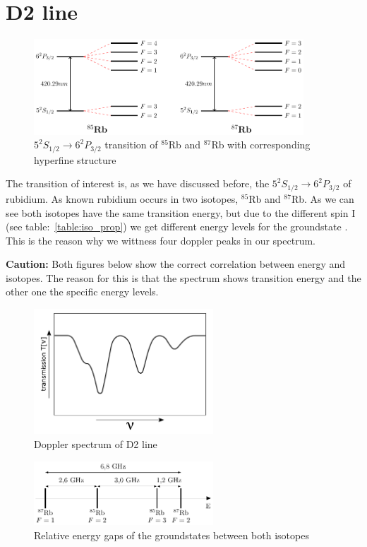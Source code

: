 \section{D2 line} %

\begin{figure}[h]
\centering
\includegraphics[width=0.9\textwidth]{energylevel}
\caption{\(5^{2}S_{1/2} \rightarrow 6^{2}P_{3/2}\) transition of \(^{85}\)Rb and \(^{87}\)Rb with corresponding hyperfine structure}    
\end{figure}

\vspace{\fill}

The transition of interest is, as we have discussed before, the \(5^{2}S_{1/2} \rightarrow 6^{2}P_{3/2}\) of rubidium. As known rubidium
occurs in two isotopes, \(^{85}\)Rb and \(^{87}\)Rb.
As we can see both isotopes have the same transition energy, but due to the different spin I (see table:~\ref{table:iso_prop}) we get
different energy levels for the groundstate \citep{nist_asd}. This is the reason why we wittness four doppler peaks in our spectrum.
\bigskip

\textbf{Caution:} Both figures below show the correct correlation between energy and isotopes. The reason for this is that the spectrum
shows transition energy and the other one the specific energy levels.

\vspace{\fill}

\begin{figure}[h]
\centering
\includegraphics[width=0.6\textwidth]{spectrum_doppler}
\caption{Doppler spectrum of D2 line}
\label{fig:doppler} 
\end{figure}

\vspace{\fill}

\begin{figure}[h]
\centering
\includegraphics[width=0.6\textwidth]{groundstate}
\caption{Relative energy gaps of the groundstates between both isotopes}
\label{fig:gap} 
\end{figure}